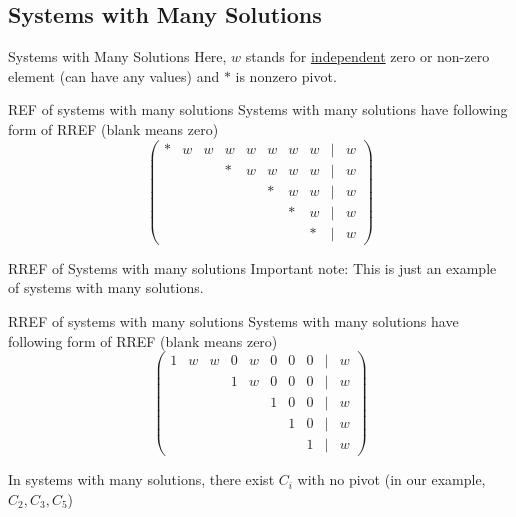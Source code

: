 \documentclass[final]{beamer}
\begin{document}
\subsection{Systems with Many Solutions} %
\label{sub:systems_with_many_solutions}
\begin{frame}[t]{Systems with Many Solutions}
	Here, $w$ stands for \uline{independent} zero or non-zero element (can have any values) and $\ast$ is nonzero pivot.
	
	\begin{block}
		{REF of systems with many solutions}
		Systems with many solutions have following form of RREF (blank means zero)
		\[
			\tag{REF} \begin{pmatrix} 
				\ast & w& w& w& w& w& w& w& \vert&w\\
				&&&\ast&w& w& w& w& \vert&w\\
				&&&&&\ast&w& w& \vert&w\\
				&&&&&&\ast&w& \vert&w\\
				&&&&&&&\ast&\vert&w
			\end{pmatrix}
		\]
	\end{block}
\end{frame}
\begin{frame}[t]{RREF of Systems with many solutions}
	Important note: This is just an example of systems with many solutions. 
	\begin{block}
		{RREF of systems with many solutions}
		Systems with many solutions have following form of RREF (blank means zero)
		\[
			\tag{RREF} \begin{pmatrix} 
				1 & w& w& 0& w& 0& 0& 0& \vert&w\\
				&&&1&w& 0& 0& 0& \vert&w\\
				&&&&&1&0& 0& \vert&w\\
				&&&&&&1&0& \vert&w\\
				&&&&&&&1&\vert&w
			\end{pmatrix}
		\]
	\end{block}
In systems with many solutions, there exist $C_i$ with no pivot (in our example, $C_2,C_3,C_5$)
\end{frame}
\end{document}
